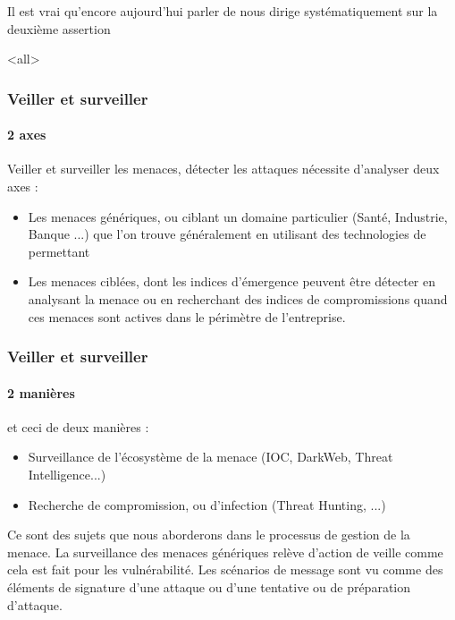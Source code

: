 
Il est vrai qu'encore aujourd'hui parler de  nous dirige systématiquement sur la deuxième assertion


\mode<all>{}



\begin{frame}
\frametitle<presentation>{Veiller et surveiller}
\framesubtitle<presentation>{2 axes}

Veiller et surveiller les menaces, détecter les attaques  nécessite d'analyser  deux axes : 

\begin{itemize}
  \item Les menaces génériques, ou ciblant un domaine  particulier (Santé, Industrie, Banque ...) que l'on trouve généralement en utilisant des technologies de  permettant 
  \item Les menaces ciblées, dont les indices d'émergence peuvent être détecter en analysant la menace ou  en recherchant des indices de compromissions quand ces menaces sont actives dans le périmètre de l'entreprise.  
\end{itemize}
\end{frame}




\begin{frame}
\frametitle<presentation>{Veiller et surveiller}
\framesubtitle<presentation>{2 manières}

et ceci de deux manières :

\begin{itemize}
  \item Surveillance de l'écosystème de la menace (IOC,  DarkWeb, Threat Intelligence...) 
  \item Recherche de compromission, ou d'infection (Threat Hunting, ...) 
\end{itemize}
\end{frame}

Ce sont des sujets que nous aborderons dans le processus de gestion de la menace.
La surveillance des menaces génériques relève d'action de veille comme cela est fait pour les vulnérabilité. Les scénarios de message sont vu comme des éléments de signature d'une attaque ou d'une tentative ou de préparation  d'attaque.

